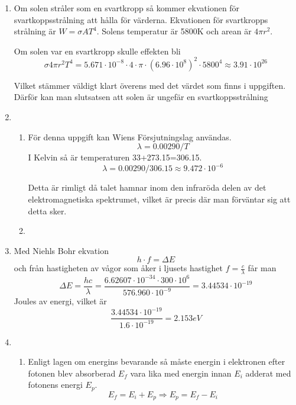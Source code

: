\documentclass[a4paper,12pt]{article}
\begin{document}
\begin{enumerate}
      \item Om solen stråler som en svartkropp så kommer ekvationen för
            svartkoppsstrålning att hålla för värderna.
            Ekvationen för svartkropps strålning är $W=\sigma A T^4$.
            Solens temperatur är 5800K och arean är $4\pi r^2$.

            Om solen var en svartkropp skulle effekten bli
            $$\sigma 4\pi r^2T^4=5.671\cdot 10^{-8} \cdot 4 \cdot \pi \cdot (6.96\cdot 10^8)^2\cdot 5800^4\approx 3.91\cdot 10^{26}$$

            Vilket stämmer väldigt klart överens med det värdet som finns i uppgiften. Därför
            kan man slutsatsen att solen är ungefär en svartkoppsstrålning

      \item
            \begin{enumerate}
                  \item För denna uppgift kan Wiens Försjutningslag användas.
                        $$\lambda=0.00290/T$$
                        I Kelvin så är temperaturen 33+273.15=306.15.
                        $$\lambda=0.00290/306.15\approx 9.472\cdot 10^{-6}$$

                        Detta är rimligt då talet hamnar inom den infraröda delen
                        av det elektromagnetiska spektrumet, vilket är precis där
                        man förväntar sig att detta sker.

                  \item
            \end{enumerate}


      \item Med Niehls Bohr ekvation
            $$h\cdot f =\Delta E$$
            och från hastigheten av vågor som åker i ljusets hastighet
            $f=\frac{c}{\lambda}$ får man
            $$\Delta E=\frac{hc}{\lambda}=\frac{6.62607\cdot 10^{-34}\cdot 300\cdot 10^6}{576.960\cdot 10^{-9}}=3.44534\cdot 10^{-19}$$
            Joules av energi, vilket är
            $$\frac{3.44534\cdot 10^{-19}}{1.6\cdot 10^{-19}}=2.153 eV$$

      \item
            \begin{enumerate}
                  \item Enligt lagen om energins bevarande så måste
                        energin i elektronen efter fotonen blev absorberad $E_f$ vara lika med
                        energin innan $E_i$ adderat med fotonens energi $E_p$.
                        $$E_f=E_i+E_p\Rightarrow E_p=E_f-E_i$$


\end{enumerate}
\end{enumerate}
\end{document}

